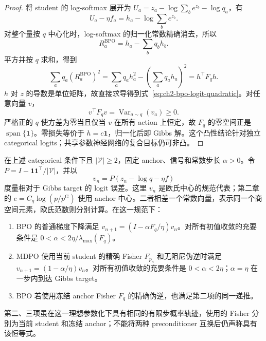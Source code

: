 \documentclass[lang=cn,scheme=chinese,openany]{../book/elegantbook}
\begin{document}
\begin{proof}
将 student 的 log-softmax 展开为 $U_a=z_a-\log\sum_b e^{z_b}-\log q_a$，有
\begin{equation*}
 U_a-\eta f_a=h_a-\log\sum_b e^{z_b}.
\end{equation*}
对整个量按 $q$ 中心化时，log-softmax 的归一化常数精确消去，所以
\begin{equation*}
 R_a^{\mathrm{BPO}}=h_a-\sum_bq_bh_b.
\end{equation*}
平方并按 $q$ 求和，得到
\begin{equation*}
 \sum_aq_a(R_a^{\mathrm{BPO}})^2
 =\sum_aq_ah_a^2-\left(\sum_aq_ah_a\right)^2=h^\top F_qh.
\end{equation*}
$h$ 对 $z$ 的导数是单位矩阵，故直接求导得到式~\eqref{eq:ch2-bpo-logit-quadratic}。对任意向量 $v$，
\begin{equation*}
 v^\top F_qv=\operatorname{Var}_{a\sim q}(v_a)\ge0.
\end{equation*}
严格正的 $q$ 使方差为零当且仅当 $v$ 在所有 action 上恒定，故 $F_q$ 的零空间正是 $\operatorname{span}\{\mathbf1\}$。零损失等价于 $h=c\mathbf1$，归一化后即 Gibbs 解。这个凸性结论针对独立 categorical logits；共享参数神经网络的复合目标仍可非凸。
\end{proof}

\begin{theorem}
\label{thm:ch2-inner-logit-step}
在上述 categorical 条件下且 $|\mathcal V|\ge2$，固定 anchor、信号和常数步长 $\alpha>0$。令 $P=I-\mathbf1\mathbf1^\top/|\mathcal V|$，并以
\begin{equation*}
 v_n=P(z_n-\log q-\eta f)
\end{equation*}
度量相对于 Gibbs target 的 logit 误差。这里 $v_n$ 是欧氏中心的规范代表；第二章的 $e=C_q\log(p/p^{\mathrm G})$ 使用 anchor 中心。二者相差一个常数向量，表示同一个商空间元素，欧氏范数则分别计算。在这一规范下：
\begin{enumerate}
 \item BPO 的普通梯度下降满足 $v_{n+1}=(I-\alpha F_q/\eta)v_n$。对所有初值收敛的充要条件是 $0<\alpha<2\eta/\lambda_{\max}(F_q)$。
 \item MDPO 使用当前 student 的精确 Fisher $F_{p_n}$ 和无阻尼伪逆时满足 $v_{n+1}=(1-\alpha/\eta)v_n$。对所有初值收敛的充要条件是 $0<\alpha<2\eta$；$\alpha=\eta$ 在一步内到达 Gibbs target。
 \item BPO 若使用冻结 anchor Fisher $F_q$ 的精确伪逆，也满足第二项的同一递推。
\end{enumerate}
第二、三项虽在这一理想参数化下具有相同的有限步概率轨迹，使用的 Fisher 分别为当前 student 和冻结 anchor；不能将两种 preconditioner 互换后仍声称具有该恒等式。
\end{theorem}
\end{document}
